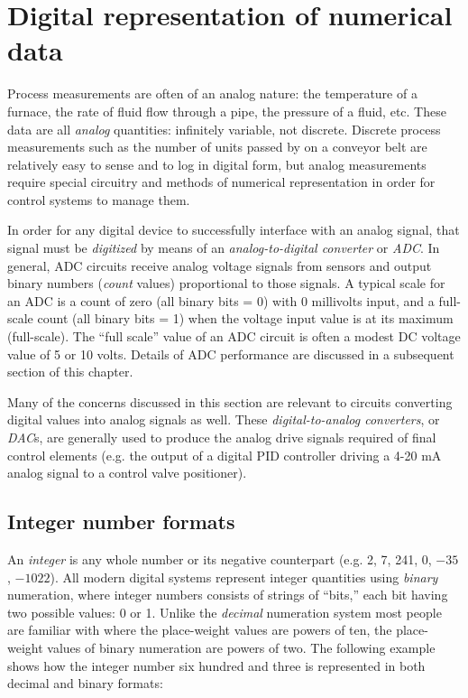 \filbreak
\section{Digital representation of numerical data}

Process measurements are often of an analog nature: the temperature of a furnace, the rate of fluid flow through a pipe, the pressure of a fluid, etc.  These data are all \textit{analog} quantities: infinitely variable, not discrete.  Discrete process measurements such as the number of units passed by on a conveyor belt are relatively easy to sense and to log in digital form, but analog measurements require special circuitry and methods of numerical representation in order for control systems to manage them.

In order for any digital device to successfully interface with an analog signal, that signal must be \textit{digitized} by means of an \textit{analog-to-digital converter} or \textit{ADC}.  In general, ADC circuits receive analog voltage signals from sensors and output binary numbers (\textit{count} values) proportional to those signals.  A typical scale for an ADC is a count of zero (all binary bits = 0) with 0 millivolts input, and a full-scale count (all binary bits = 1) when the voltage input value is at its maximum (full-scale).  The ``full scale'' value of an ADC circuit is often a modest DC voltage value of 5 or 10 volts.  Details of ADC performance are discussed in a subsequent section of this chapter.      

Many of the concerns discussed in this section are relevant to circuits converting digital values into analog signals as well.  These \textit{digital-to-analog converters}, or \textit{DAC}s, are generally used to produce the analog drive signals required of final control elements (e.g. the output of a digital PID controller driving a 4-20 mA analog signal to a control valve positioner).    










\filbreak
\subsection{Integer number formats}

An \textit{integer} is any whole number or its negative counterpart (e.g. 2, 7, 241, 0, $-35$, $-1022$).  All modern digital systems represent integer quantities using \textit{binary} numeration, where integer numbers consists of strings of ``bits,'' each bit having two possible values: 0 or 1.  Unlike the \textit{decimal} numeration system most people are familiar with where the place-weight values are powers of ten, the place-weight values of binary numeration are powers of two.  The following example shows how the integer number six hundred and three is represented in both decimal and binary formats:          

